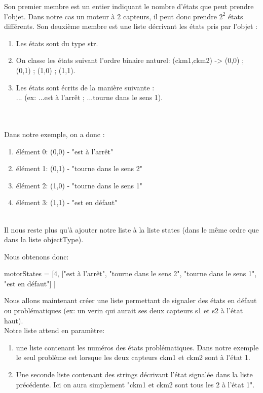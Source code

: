 Son premier membre est un entier indiquant le nombre d'états que peut prendre l'objet. Dans notre cas un moteur à 2 capteurs, il peut donc prendre $ 2^2 $ états différents.
Son deuxième membre est une liste décrivant les états pris par l'objet :

\begin{enumerate}
    \item Les états sont du type str.
    \item On classe les états suivant l'ordre binaire naturel: (ckm1,ckm2) -> (0,0) ; (0,1) ; (1,0) ; (1,1).
    \item Les états sont écrits de la manière suivante : \\
     ... (ex: ...est à l'arrêt ; ...tourne dans le sens 1).
\end{enumerate}\\ \\

Dans notre exemple, on a donc : 

\begin{enumerate}
    \item élément 0: (0,0) - "est à l'arrêt"
    \item élément 1: (0,1) - "tourne dans le sens 2"
    \item élément 2: (1,0) - "tourne dans le sens 1"
    \item élément 3: (1,1) - "est en défaut"
\end{enumerate}\\

Il nous reste plus qu'à ajouter notre liste à la liste states (dans le même ordre que dans la liste objectType).

Nous obtenons donc:

\begin{pyCode}
    motorStates = [4, ["est à l'arrêt", "tourne dans le sens 2", "tourne dans le sens 1", "est en défaut"] ]
\end{pyCode}


Nous allons maintenant créer une liste permettant de signaler des états en défaut ou problématiques (ex: un verin qui aurait ses deux capteurs s1 et s2 à l'état haut).\\

Notre liste attend en paramètre:
\begin{enumerate}
    \item une liste contenant les numéros des états problématiques. Dans notre exemple le seul problème est lorsque les deux capteurs ckm1 et ckm2 sont à l'état 1. 
    \item Une seconde liste contenant des strings décrivant l'état signalée dans la liste précédente. Ici on aura simplement "ckm1 et ckm2 sont tous les 2 à l'état 1".
\end{enumerate}\\

